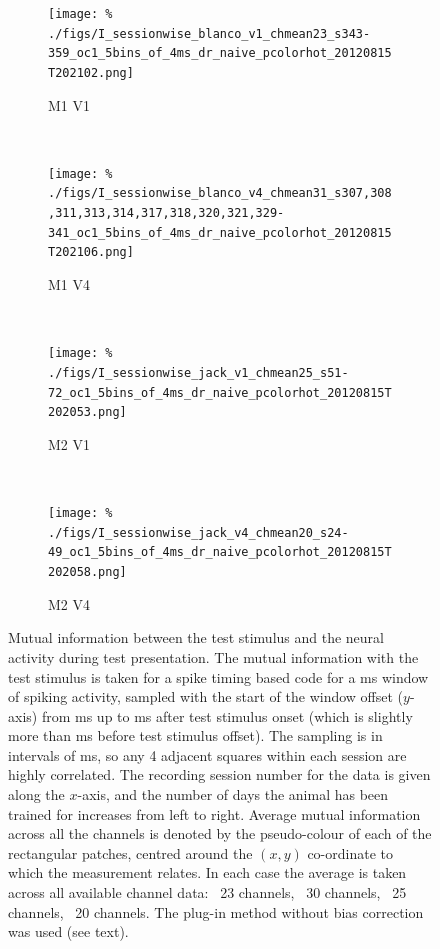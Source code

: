 \begin{figure}[htbp]
    \begin{subfigure}[b]{0.5\linewidth}
        \centering
        \caption{M1 V1}
        \label{fig:sessb1}
        \texttt{[image: \%
./figs/I\_sessionwise\_blanco\_v1\_chmean23\_s343-359\_oc1\_5bins\_of\_4ms\_dr\_naive\_pcolorhot\_20120815T202102.png]}
    \end{subfigure}
    ~~
    \begin{subfigure}[b]{0.5\linewidth}
        \centering
        \caption{M1 V4}
        \label{fig:sessb4}
        \texttt{[image: \%
./figs/I\_sessionwise\_blanco\_v4\_chmean31\_s307,308,311,313,314,317,318,320,321,329-341\_oc1\_5bins\_of\_4ms\_dr\_naive\_pcolorhot\_20120815T202106.png]}
    \end{subfigure}
    \\
    \begin{subfigure}[b]{0.5\linewidth}
        \centering
        \caption{M2 V1}
        \label{fig:sessj1}
        \texttt{[image: \%
./figs/I\_sessionwise\_jack\_v1\_chmean25\_s51-72\_oc1\_5bins\_of\_4ms\_dr\_naive\_pcolorhot\_20120815T202053.png]}
    \end{subfigure}
    ~~
    \begin{subfigure}[b]{0.5\linewidth}
        \centering
        \caption{M2 V4}
        \label{fig:sessj4}
        \texttt{[image: \%
./figs/I\_sessionwise\_jack\_v4\_chmean20\_s24-49\_oc1\_5bins\_of\_4ms\_dr\_naive\_pcolorhot\_20120815T202058.png]}
    \end{subfigure}
    \caption{Mutual information between the test stimulus and the neural activity during test presentation.
The mutual information with the test stimulus is taken for a spike timing based code for a \unit[20]{ms} window of spiking activity, sampled with the start of the window offset ($y$-axis) from \unit[0]{ms} up to \unit[500]{ms} after test stimulus onset (which is slightly more than \unit[20]{ms} before test stimulus offset). The sampling is in intervals of \unit[5]{ms}, so any 4 adjacent squares within each session are highly correlated.
The recording session number for the data is given along the $x$-axis, and the number of days the animal has been trained for increases from left to right.
Average mutual information across all the channels is denoted by the pseudo-colour of each of the rectangular patches, centred around the $(x,y)$ co-ordinate to which the measurement relates.
In each case the average is taken across all available channel data: ~23 channels, ~30 channels, ~25 channels, ~20 channels.
The plug-in method without bias correction was used (see text).
}
    \label{fig:sess}
\end{figure}

